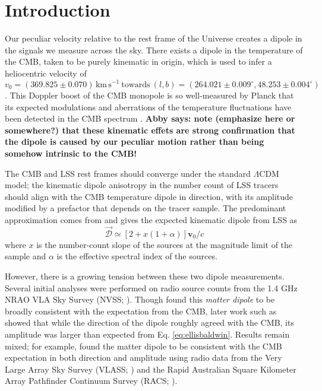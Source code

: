 \documentclass[modern]{aastex631}
\newcommand{\abby}[1]{\textbf{Abby says: #1}}
\newcommand{\vobs}{\boldsymbol{v}_0}
\begin{document}
\section{Introduction}
Our peculiar velocity relative to the rest frame of the Universe creates a dipole in the signals we measure across the sky.
There exists a dipole in the temperature of the CMB, taken to be purely kinematic in origin, which is used to infer a heliocentric velocity of
\begin{equation}
    \label{eq:CMB_velocity}
    v_0 = (369.825\pm 0.070)\,\mathrm{km\, s}^{-1}\ \mathrm{towards}\ (l,b) = (264.021\pm0.009^\circ, 48.253\pm0.004^\circ)
\end{equation}
\citep{planck_collaboration_planck_2020}.
This Doppler boost of the CMB monopole is so well-measured by Planck that its expected modulations and aberrations of the temperature fluctuations have been detected in the CMB spectrum \citep{planck_collaboration_planck_2014}.
\abby{note (emphasize here or somewhere?) that these kinematic effets are strong confirmation that the dipole is caused by our peculiar motion rather than being somehow intrinsic to the CMB!}

The CMB and LSS rest frames should converge under the standard $\Lambda$CDM model; the kinematic dipole anisotropy in the number count of LSS tracers should align with the CMB temperature dipole in direction, with its amplitude modified by a prefactor that depends on the tracer sample.
The predominant approximation comes from \citet{ellis_expected_1984} and gives the expected kinematic dipole from LSS as
\begin{equation}
    \label{eq:ellisbaldwin}
    \vec{\mathcal{D}} \simeq \left[2+x(1+\alpha)\right]\vobs/c
\end{equation}
where $x$ is the number-count slope of the sources at the magnitude limit of the sample and $\alpha$ is the effective spectral index of the sources.

However, there is a growing tension between these two dipole measurements.
Several initial analyses were performed on radio source counts from the 1.4 GHz NRAO VLA Sky Survey (NVSS; \citealt{condon_nrao_1998}).
Though \citet{blake_velocity_2002} found this \textit{matter dipole} to be broadly consistent with the expectation from the CMB, later work such as \citet{singal_large_2011} showed that while the direction of the dipole roughly agreed with the CMB, its amplitude was larger than expected from Eq. \ref{eq:ellisbaldwin}.
Results remain mixed; for example, \citet{darling_universe_2022} found the matter dipole to be consistent with the CMB expectation in both direction and amplitude using radio data from the Very Large Array Sky Survey (VLASS; \citealt{lacy_karl_2020}) and the Rapid
Australian Square Kilometer Array Pathfinder Continuum
Survey (RACS; \citealt{mcconnell_rapid_2020}).
\end{document}
